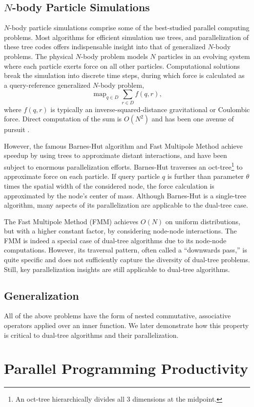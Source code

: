 \documentclass[twoside,leqno,twocolumn]{article}
\DeclareMathOperator*{\map}{map}
\newcommand{\mysub}[1]{\subsection{#1} }
\begin{document}
\mysub{$N$-body Particle Simulations}

$N$-body particle simulations comprise some of the best-studied parallel computing problems.
Most algorithms for efficient simulation use trees, and parallelization of these tree codes offers indispensable insight into that of generalized $N$-body problems.
The physical $N$-body problem models $N$ particles in an evolving system where each particle exerts force on all other particles.
Computational solutions break the simulation into discrete time steps, during which force is calculated as a query-reference generalized $N$-body problem,
\[\map_{q \in D} \sum_{r \in D} f(q,r),\]
\noindent where $f(q,r)$ is typically an inverse-squared-distance gravitational or Coulombic force.
Direct computation of the sum is $O(N^2)$ and has been one avenue of pursuit \cite{grape}.

However, the famous Barnes-Hut algorithm\cite{barnes_hut} and Fast Multipole Method\cite{greengard_fmm} achieve speedup by using trees to approximate distant interactions, and have been subject to enormous parallelization efforts.
Barnes-Hut\cite{barnes_hut} traverses an oct-tree\footnote{An oct-tree hierarchically divides all 3 dimensions at the midpoint.} to approximate force on each particle.
If query particle $q$ is further than parameter $\theta$ times the spatial width of the considered node, the force calculation is approximated by the node's center of mass.
Although Barnes-Hut is a single-tree algorithm, many aspects of its parallelization are applicable to the dual-tree case.

The Fast Multipole Method (FMM)\cite{greengard_fmm} achieves $O(N)$ on uniform distributions, but with a higher constant factor, by considering node-node interactions.
The FMM is indeed a special case of dual-tree algorithms due to its node-node computations.
However, its traversal pattern, often called a ``downwards pass,'' is quite specific and does not sufficiently capture the diversity of dual-tree problems.
Still, key parallelization insights are still applicable to dual-tree algorithms.

\mysub{Generalization}
All of the above problems have the form of nested commutative, associative operators applied over an inner function.
We later demonstrate how this property is critical to dual-tree algorithms and their parallelization.


\section{Parallel Programming Productivity}
\end{document}

